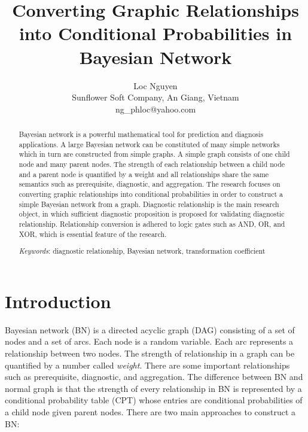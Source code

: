 \documentclass{article}
\numberwithin{equation}{section}
\numberwithin{figure}{section}
\numberwithin{table}{section}
\begin{document}
\title{Converting Graphic Relationships into Conditional Probabilities in Bayesian Network}

\author{
Loc Nguyen\\
Sunflower Soft Company, An Giang, Vietnam\\
ng\_phloc@yahoo.com
}

\maketitle

\begin{abstract}
Bayesian network is a powerful mathematical tool for prediction and diagnosis applications. A large Bayesian network can be constituted of many simple networks which in turn are constructed from simple graphs. A simple graph consists of one child node and many parent nodes. The strength of each relationship between a child node and a parent node is quantified by a weight and all relationships share the same semantics such as prerequisite, diagnostic, and aggregation. The research focuses on converting graphic relationships into conditional probabilities in order to construct a simple Bayesian network from a graph. Diagnostic relationship is the main research object, in which sufficient diagnostic proposition is proposed for validating diagnostic relationship. Relationship conversion is adhered to logic gates such as AND, OR, and XOR, which is essential feature of the research.

\textit{Keywords}: diagnostic relationship, Bayesian network, transformation coefficient
\end{abstract}

\section{Introduction}
Bayesian network (BN) is a directed acyclic graph (DAG) consisting of a set of nodes and a set of arcs. Each node is a random variable. Each arc represents a relationship between two nodes. The strength of relationship in a graph can be quantified by a number called \textit{weight}. There are some important relationships such as prerequisite, diagnostic, and aggregation. The difference between BN and normal graph is that the strength of every relationship in BN is represented by a conditional probability table (CPT) whose entries are conditional probabilities of a child node given parent nodes. There are two main approaches to construct a BN:
\end{document}
